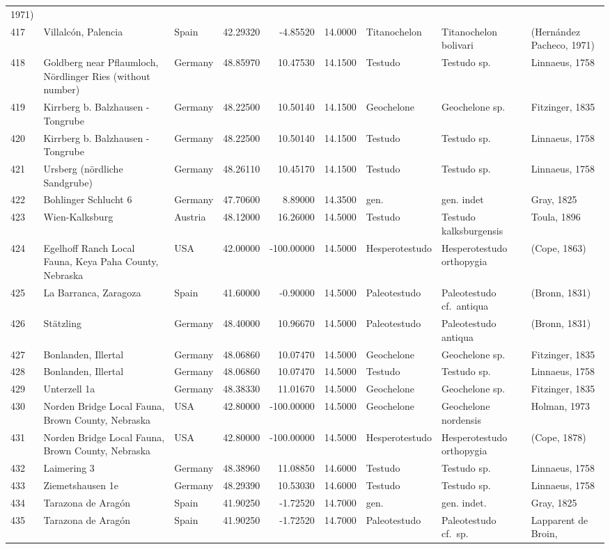 \begin{landscape}
{\begin{longtable}[]{@{}lllrrrlll@{}}
1971)\tabularnewline
417 & Villalcón, Palencia & Spain & 42.29320 & -4.85520 & 14.0000 &
Titanochelon & Titanochelon bolivari & (Hernández Pacheco,
1971)\tabularnewline
418 & Goldberg near Pflaumloch, Nördlinger Ries (without number) &
Germany & 48.85970 & 10.47530 & 14.1500 & Testudo & Testudo sp. &
Linnaeus, 1758\tabularnewline
419 & Kirrberg b. Balzhausen - Tongrube & Germany & 48.22500 & 10.50140
& 14.1500 & Geochelone & Geochelone sp. & Fitzinger, 1835\tabularnewline
420 & Kirrberg b. Balzhausen - Tongrube & Germany & 48.22500 & 10.50140
& 14.1500 & Testudo & Testudo sp. & Linnaeus, 1758\tabularnewline
421 & Ursberg (nördliche Sandgrube) & Germany & 48.26110 & 10.45170 &
14.1500 & Testudo & Testudo sp. & Linnaeus, 1758\tabularnewline
422 & Bohlinger Schlucht 6 & Germany & 47.70600 & 8.89000 & 14.3500 &
gen. & gen. indet & Gray, 1825\tabularnewline
423 & Wien-Kalksburg & Austria & 48.12000 & 16.26000 & 14.5000 & Testudo
& Testudo kalksburgensis & Toula, 1896\tabularnewline
424 & Egelhoff Ranch Local Fauna, Keya Paha County, Nebraska & USA &
42.00000 & -100.00000 & 14.5000 & Hesperotestudo & Hesperotestudo
orthopygia & (Cope, 1863)\tabularnewline
425 & La Barranca, Zaragoza & Spain & 41.60000 & -0.90000 & 14.5000 &
Paleotestudo & Paleotestudo cf.~antiqua & (Bronn, 1831)\tabularnewline
426 & Stätzling & Germany & 48.40000 & 10.96670 & 14.5000 & Paleotestudo
& Paleotestudo antiqua & (Bronn, 1831)\tabularnewline
427 & Bonlanden, Illertal & Germany & 48.06860 & 10.07470 & 14.5000 &
Geochelone & Geochelone sp. & Fitzinger, 1835\tabularnewline
428 & Bonlanden, Illertal & Germany & 48.06860 & 10.07470 & 14.5000 &
Testudo & Testudo sp. & Linnaeus, 1758\tabularnewline
429 & Unterzell 1a & Germany & 48.38330 & 11.01670 & 14.5000 &
Geochelone & Geochelone sp. & Fitzinger, 1835\tabularnewline
430 & Norden Bridge Local Fauna, Brown County, Nebraska & USA & 42.80000
& -100.00000 & 14.5000 & Geochelone & Geochelone nordensis & Holman,
1973\tabularnewline
431 & Norden Bridge Local Fauna, Brown County, Nebraska & USA & 42.80000
& -100.00000 & 14.5000 & Hesperotestudo & Hesperotestudo orthopygia &
(Cope, 1878)\tabularnewline
432 & Laimering 3 & Germany & 48.38960 & 11.08850 & 14.6000 & Testudo &
Testudo sp. & Linnaeus, 1758\tabularnewline
433 & Ziemetshausen 1e & Germany & 48.29390 & 10.53030 & 14.6000 &
Testudo & Testudo sp. & Linnaeus, 1758\tabularnewline
434 & Tarazona de Aragón & Spain & 41.90250 & -1.72520 & 14.7000 & gen.
& gen. indet. & Gray, 1825\tabularnewline
435 & Tarazona de Aragón & Spain & 41.90250 & -1.72520 & 14.7000 &
Paleotestudo & Paleotestudo cf.~sp. & Lapparent de Broin,

\end{longtable}}
\end{landscape}
